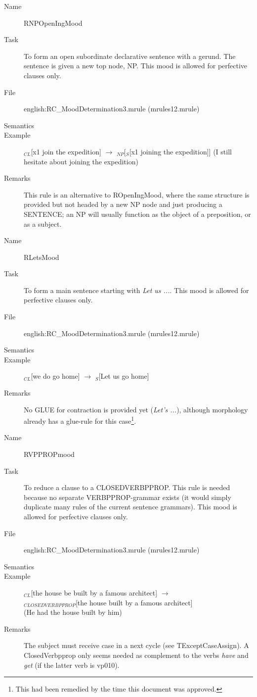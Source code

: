 \begin{description}
\vspace{1 cm}
\begin{description}
\item[Name] RNPOpenIngMood
\item[Task] To form an open subordinate declarative sentence with a gerund. The 
sentence is given a new top node, NP.
This mood is allowed for perfective clauses only. 
\item[File] english:RC\_MoodDetermination3.mrule (mrules12.mrule)
\item[Semantics]
\item[Example] $_{CL}$[x1 join the expedition] $\rightarrow$ $_{NP}$[$_S$[x1 
joining the expedition]] (I still hesitate about joining the expedition)
\item[Remarks] This rule is an alternative to ROpenIngMood, where the same 
structure is provided but not headed by a new NP node
and just producing a SENTENCE; an NP will usually function 
as the object of a preposition, or as a subject.
\end{description}

\vspace{1 cm}
\begin{description}
\item[Name] RLetsMood
\item[Task] To form a main sentence starting with {\em Let us ...\/}. 
This mood is allowed for perfective clauses only. 
\item[File] english:RC\_MoodDetermination3.mrule (mrules12.mrule)
\item[Semantics]
\item[Example] $_{CL}$[we do go home] $\rightarrow$ $_S$[Let us go home]
\item[Remarks] No GLUE for contraction is provided yet ({\em Let's ...\/}),
although morphology already has a glue-rule for this case\footnote{This had 
been remedied by the time this document was approved.}.
\end{description}

\vspace{1 cm}
\begin{description}
\item[Name] RVPPROPmood
\item[Task] To reduce a clause to a CLOSEDVERBPPROP. This rule is needed 
because no separate VERBPPROP-grammar exists (it would simply duplicate many 
rules of the current sentence grammars).
This mood is allowed for perfective clauses only. 
\item[File] english:RC\_MoodDetermination3.mrule (mrules12.mrule)
\item[Semantics]
\item[Example] $_{CL}$[the house be built by a famous architect] $\rightarrow$
\\ 
$_{CLOSEDVERBPPROP}$[the house built by a famous architect] \\ 
(He had the house built by him)
\item[Remarks] The subject must receive case in a next cycle (see 
TExceptCaseAssign). A ClosedVerbpprop only seems needed as complement to the 
verbs {\em have\/} and {\em get\/} (if the latter verb is vp010).
\end{description}


\end{description}
